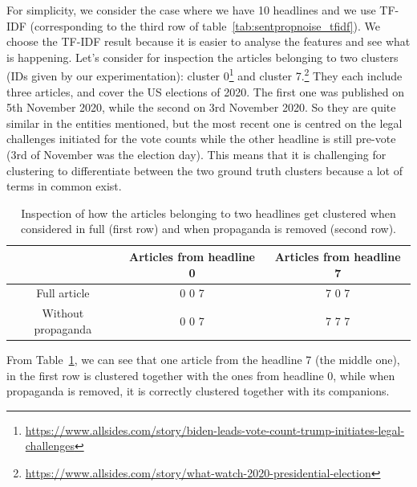 For simplicity, we consider the case where we have 10 headlines and we use TF-IDF (corresponding to the third row of table~\ref{tab:sentpropnoise_tfidf}). We choose the TF-IDF result because it is easier to analyse the features and see what is happening.
Let’s consider for inspection the articles belonging to two clusters (IDs given by our experimentation): cluster 0\footnote{\url{https://www.allsides.com/story/biden-leads-vote-count-trump-initiates-legal-challenges}} and cluster 7.\footnote{\url{https://www.allsides.com/story/what-watch-2020-presidential-election}}
They each include three articles, and cover the US elections of 2020. The first one was published on 5th November 2020, while the second on 3rd November 2020. So they are quite similar in the entities mentioned, but the most recent one is centred on the legal challenges initiated for the vote counts while the other headline is still pre-vote (3rd of November was the election day). This means that it is challenging for clustering to differentiate between the two ground truth clusters because a lot of terms in common exist.

\begin{table}[!htbp]
    \centering
    \begin{tabular}{c|c|c}
         & Articles from headline 0 & Articles from headline 7 \\
         \hline
        Full article & 0 0 7 & 7 0 7 \\
        Without propaganda & 0 0 7 & 7 7 7
    \end{tabular}
    \caption{Inspection of how the articles belonging to two headlines get clustered when considered in full (first row) and when propaganda is removed (second row).}
    \label{tab:sentpropnoise_inspection}
\end{table}



From Table~\ref{tab:sentpropnoise_inspection}, we can see that one article from the headline 7 (the middle one), in the first row is clustered together with the ones from headline 0, while when propaganda is removed, it is correctly clustered together with its companions.

